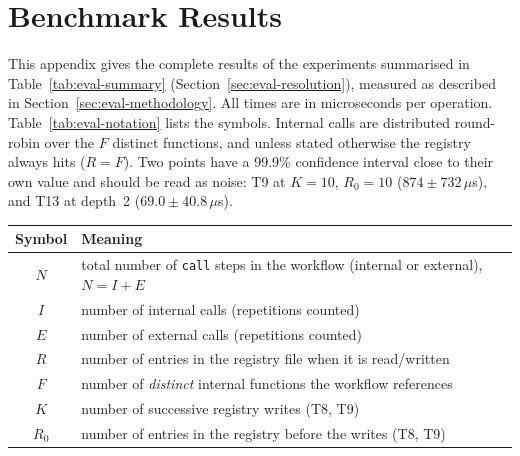 \chapter{Benchmark Results}
\label{app:benchmarks}
\raggedbottom

This appendix gives the complete results of the experiments summarised in
Table~\ref{tab:eval-summary} (Section~\ref{sec:eval-resolution}), measured as described in
Section~\ref{sec:eval-methodology}. All times are in microseconds per operation. Table~\ref{tab:eval-notation}
lists the symbols. Internal calls are distributed round-robin over the $F$ distinct functions, and
unless stated otherwise the registry always hits ($R{=}F$). Two points have a 99.9\% confidence
interval close to their own value and should be read as noise: T9 at $K{=}10$, $R_0{=}10$
($874 \pm 732\,\mu$s), and T13 at depth~2 ($69.0 \pm 40.8\,\mu$s).

\noindent\begin{minipage}{\textwidth}
  \centering
  \label{tab:eval-notation}
  \begin{tabular}{|c|>{\raggedright\arraybackslash}p{}|}
    \hline
    \textbf{Symbol} & \textbf{Meaning} \\
    \hline
    $N$ & total number of \texttt{call} steps in the workflow (internal or external), $N = I + E$ \\
    \hline
    $I$ & number of internal calls (repetitions counted) \\
    \hline
    $E$ & number of external calls (repetitions counted) \\
    \hline
    $R$ & number of entries in the registry file when it is read/written \\
    \hline
    $F$ & number of \emph{distinct} internal functions the workflow references \\
    \hline
    $K$ & number of successive registry writes (T8, T9) \\
    \hline
    $R_0$ & number of entries in the registry before the writes (T8, T9) \\
    \hline
  \end{tabular}
\end{minipage}

